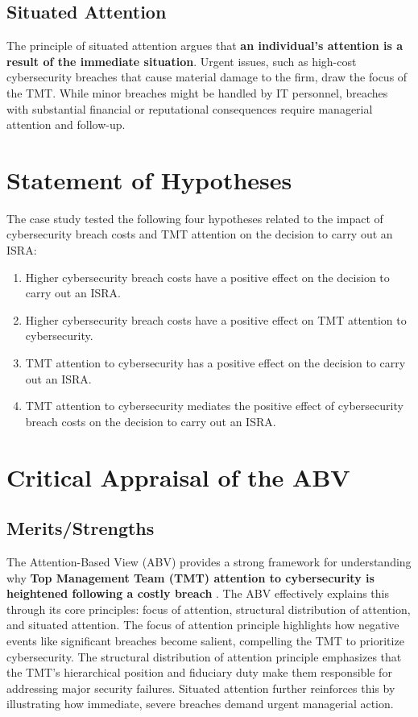 \subsection{Situated Attention}
The principle of situated attention argues that \textbf{an individual’s attention is a result of the immediate situation}. Urgent issues, such as high-cost cybersecurity breaches that cause material damage to the firm, draw the focus of the TMT. While minor breaches might be handled by IT personnel, breaches with substantial financial or reputational consequences require managerial attention and follow-up.

\section{Statement of Hypotheses}
The case study tested the following four hypotheses related to the impact of cybersecurity breach costs and TMT attention on the decision to carry out an ISRA:
\begin{enumerate}
    \item Higher cybersecurity breach costs have a positive effect on the decision to carry out an ISRA.
    \item Higher cybersecurity breach costs have a positive effect on TMT attention to cybersecurity.
    \item TMT attention to cybersecurity has a positive effect on the decision to carry out an ISRA.
    \item TMT attention to cybersecurity mediates the positive effect of cybersecurity breach costs on the decision to carry out an ISRA.
\end{enumerate}

\section{Critical Appraisal of the ABV}
\subsection{Merits/Strengths}
The Attention-Based View (ABV) provides a strong framework for understanding why \textbf{Top Management Team (TMT) attention to cybersecurity is heightened following a costly breach} \citep{shaikh2023information}. The ABV effectively explains this through its core principles: focus of attention, structural distribution of attention, and situated attention. The focus of attention principle highlights how negative events like significant breaches become salient, compelling the TMT to prioritize cybersecurity. The structural distribution of attention principle emphasizes that the TMT's hierarchical position and fiduciary duty make them responsible for addressing major security failures. Situated attention further reinforces this by illustrating how immediate, severe breaches demand urgent managerial action.


